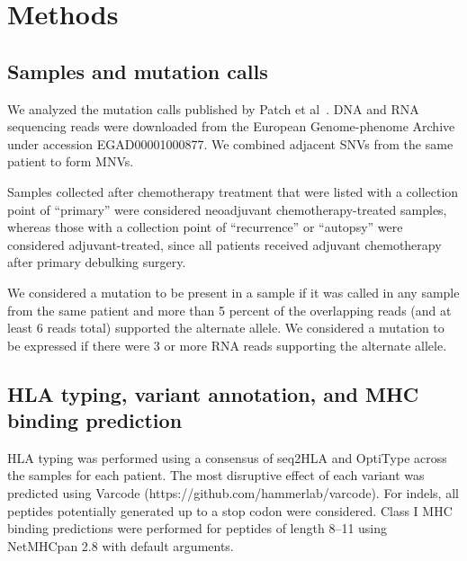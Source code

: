 \section*{Methods}

\subsection*{Samples and mutation calls}
We analyzed the mutation calls published by Patch et al~\cite{Patch_2015}. DNA and RNA sequencing reads were downloaded from the European Genome-phenome Archive under accession EGAD00001000877. We combined adjacent SNVs from the same patient to form MNVs.

Samples collected after chemotherapy treatment that were listed with a collection point of ``primary'' were considered neoadjuvant chemotherapy-treated samples, whereas those with a collection point of ``recurrence'' or ``autopsy'' were considered adjuvant-treated, since all patients received adjuvant chemotherapy after primary debulking surgery.


We considered a mutation to be present in a sample if it was called in any sample from the same patient and more than 5 percent of the overlapping reads (and at least 6 reads total) supported the alternate allele. We considered a mutation to be expressed if there were 3 or more RNA reads supporting the alternate allele.


\subsection*{HLA typing, variant annotation, and MHC binding prediction}
\begin{sloppypar}
HLA typing was performed using a consensus of seq2HLA\cite{Boegel_2012} and OptiType\cite{Szolek_2014} across the samples for each patient. The most disruptive effect of each variant was predicted using Varcode (https://github.com/hammerlab/varcode). For indels, all peptides potentially generated up to a stop codon were considered. Class I MHC binding predictions were performed for peptides of length 8--11 using NetMHCpan 2.8\cite{Lundegaard_2008} with default arguments.
\end{sloppypar}

